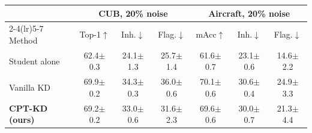 \begin{tabular}{l ccc ccc}
\toprule
 & \multicolumn{3}{c}{CUB, 20\% noise} & \multicolumn{3}{c}{Aircraft, 20\% noise} \\
\cmidrule(lr){2-4}\cmidrule(lr){5-7}
Method & Top-1$\uparrow$ & Inh.$\downarrow$ & Flag.$\downarrow$ & mAcc$\uparrow$ & Inh.$\downarrow$ & Flag.$\downarrow$ \\
\midrule
Student alone & 62.4{\scriptsize$\pm$0.3} & 24.1{\scriptsize$\pm$1.3} & 25.7{\scriptsize$\pm$1.4} & 61.6{\scriptsize$\pm$0.7} & 23.1{\scriptsize$\pm$0.6} & 14.6{\scriptsize$\pm$2.2} \\
Vanilla KD & 69.9{\scriptsize$\pm$0.2} & 34.3{\scriptsize$\pm$0.3} & 36.0{\scriptsize$\pm$0.6} & 70.1{\scriptsize$\pm$0.6} & 30.6{\scriptsize$\pm$0.4} & 24.9{\scriptsize$\pm$3.3} \\
\textbf{CPT-KD (ours)} & 69.2{\scriptsize$\pm$0.2} & 33.0{\scriptsize$\pm$0.6} & 31.6{\scriptsize$\pm$2.3} & 69.6{\scriptsize$\pm$0.6} & 30.0{\scriptsize$\pm$0.7} & 21.3{\scriptsize$\pm$4.4} \\
\bottomrule
\end{tabular}
